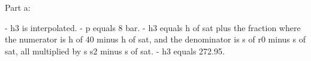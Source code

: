 Part a:

- h3 is interpolated.
- p equals 8 bar.
- h3 equals h of sat plus the fraction where the numerator is h of 40 minus h of sat, and the denominator is s of r0 minus s of sat, all multiplied by s s2 minus s of sat.
- h3 equals 272.95.